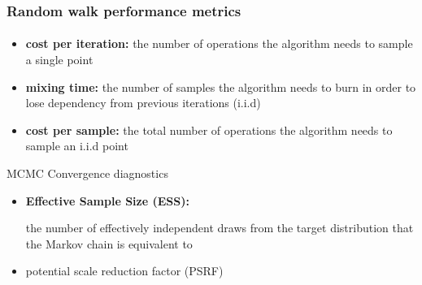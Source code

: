 \documentclass{beamer}
\begin{document}
   \begin{frame}
      \frametitle{Random walk performance metrics}
      \framesubtitle{}
      
      \begin{itemize}
         \item \textbf{cost per iteration:} the number of operations the algorithm needs to sample a single point
         \item \textbf{mixing time:} the number of samples the algorithm needs to burn in order to lose dependency from previous iterations (i.i.d)
         \item \textbf{cost per sample:} the total number of operations the algorithm needs to sample an i.i.d point

      \end{itemize}

      MCMC Convergence diagnostics

      \begin{itemize}
         \item \textbf{Effective Sample Size (ESS): } 


         the number of effectively independent draws from
         the target distribution that the Markov chain is equivalent to

         \item potential scale reduction factor (PSRF)
         
      \end{itemize}
   
   \end{frame}
\end{document}
